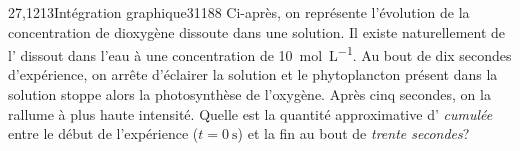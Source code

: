         \begin{question}{27,1213}{Intégration graphique}{3}{1188}
             Ci-après, on représente l'évolution de la concentration de dioxygène dissoute dans une solution. Il existe naturellement de l' dissout dans l'eau à une concentration de \SI{10}{\mol\per\liter}. Au bout de dix secondes d'expérience, on arrête d'éclairer la solution et le phytoplancton présent dans la solution stoppe alors la photosynthèse de l'oxygène. Après cinq secondes, on la rallume à plus haute intensité. Quelle est la quantité approximative d' \emph{cumulée} entre le début de l'expérience ($t=\SI{0}{\second}$) et la fin au bout de \emph{trente secondes}?
            \begin{figure}
             \end{figure}
        \end{question}
